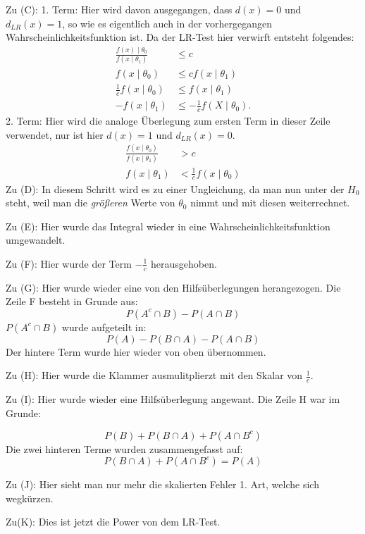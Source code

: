 \documentclass[10pt]{article}
\newcommand{\dlr}{d_{LR}}%
\newenvironment{BWS}[1][]
{\begin{Beweis}[frametitle=#1]}{\end{Beweis}}
\begin{document}
\begin{BWS}[Beweis (NP-Lemma)]
\begin{Bemerkung}
			Zu (C): 1. Term: Hier wird davon ausgegangen, dass $d(x) =0$ und $\dlr(x) = 1$, so wie es eigentlich auch in der vorhergegangen Wahrscheinlichkeitsfunktion ist. Da der LR-Test hier verwirft entsteht folgendes:
			\begin{equation*}
				\begin{split}
					\frac{f(x) \mid \theta_0}{f(x\mid \theta_1)} &\leq c \\
					f(x\mid \theta_0) &\leq c f(x\mid \theta_1)\\
					\frac{1}{c} f(x\mid \theta_0) &\leq f(x\mid \theta_1)\\
					-f(x\mid \theta_1) &\leq -\frac{1}{c} f(X\mid \theta_0).
				\end{split}
			\end{equation*}
			2. Term: Hier wird die analoge Überlegung zum ersten Term in dieser Zeile verwendet, nur ist hier $d(x) = 1$ und $\dlr(x)=0$. 
			\begin{equation*}
				\begin{split}
					\frac{f(x \mid \theta_0)}{f(x\mid \theta_1)} &> c \\
					f(x\mid \theta_1) &< \frac{1}{c} f(x \mid \theta_0)
				\end{split}
			\end{equation*}
			Zu (D): In diesem Schritt wird es zu einer Ungleichung, da man nun unter der $H_0$ steht, weil man die \textit{größeren} Werte von $\theta_0$ nimmt und mit diesen weiterrechnet.
			
			Zu (E): Hier wurde das Integral wieder in eine Wahrscheinlichkeitsfunktion umgewandelt.
			
			Zu (F): Hier wurde der Term $-\frac{1}{c}$ herausgehoben.
			
			Zu (G): Hier wurde wieder eine von den Hilfsüberlegungen herangezogen. Die Zeile F besteht in Grunde aus: 
			\begin{equation*}
				P(A^c \cap B) - P(A \cap B)
			\end{equation*}
			$P(A^c \cap B)$ wurde aufgeteilt in:
			\begin{equation*}
				P(A) - P(B \cap A) - P(A \cap B)
			\end{equation*}
			Der hintere Term wurde hier wieder von oben übernommen.
			
			Zu (H): Hier wurde die Klammer ausmulitplierzt mit den Skalar von $\frac{1}{c}$. 
			
			Zu (I): Hier wurde wieder eine Hilfsüberlegung angewant. Die Zeile H war im Grunde:
			
			\begin{equation*}
				P(B) + P(B \cap A) + P(A \cap B^c)
			\end{equation*}
			Die zwei hinteren Terme wurden zusammengefasst auf:
			\begin{equation*}
				P(B \cap A) + P(A \cap B^c) = P(A)
			\end{equation*}
			
			Zu (J): Hier sieht man nur mehr die skalierten Fehler 1. Art, welche sich wegkürzen.
			
			Zu(K): Dies ist jetzt die Power von dem LR-Test. 
		\end{Bemerkung}
		\end{BWS}
	
\end{document}
